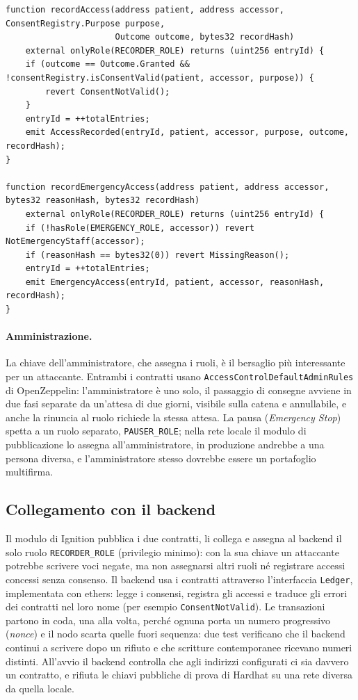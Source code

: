 \begin{lstlisting}[language=Solidity,caption={Registrazione degli accessi (\texttt{AuditLog.sol}, estratto).},label={lst:audit}]
function recordAccess(address patient, address accessor, ConsentRegistry.Purpose purpose,
                      Outcome outcome, bytes32 recordHash)
    external onlyRole(RECORDER_ROLE) returns (uint256 entryId) {
    if (outcome == Outcome.Granted && !consentRegistry.isConsentValid(patient, accessor, purpose)) {
        revert ConsentNotValid();
    }
    entryId = ++totalEntries;
    emit AccessRecorded(entryId, patient, accessor, purpose, outcome, recordHash);
}

function recordEmergencyAccess(address patient, address accessor, bytes32 reasonHash, bytes32 recordHash)
    external onlyRole(RECORDER_ROLE) returns (uint256 entryId) {
    if (!hasRole(EMERGENCY_ROLE, accessor)) revert NotEmergencyStaff(accessor);
    if (reasonHash == bytes32(0)) revert MissingReason();
    entryId = ++totalEntries;
    emit EmergencyAccess(entryId, patient, accessor, reasonHash, recordHash);
}
\end{lstlisting}

\paragraph{Amministrazione.} La chiave dell'amministratore, che assegna i ruoli, è il bersaglio più interessante per un attaccante. Entrambi i contratti usano \texttt{AccessControlDefaultAdminRules} di OpenZeppelin: l'amministratore è uno solo, il passaggio di consegne avviene in due fasi separate da un'attesa di due giorni, visibile sulla catena e annullabile, e anche la rinuncia al ruolo richiede la stessa attesa. La pausa (\emph{Emergency Stop}) spetta a un ruolo separato, \texttt{PAUSER\_ROLE}; nella rete locale il modulo di pubblicazione lo assegna all'amministratore, in produzione andrebbe a una persona diversa, e l'amministratore stesso dovrebbe essere un portafoglio multifirma.

\subsection{Collegamento con il backend}\label{sec:collegamento}
Il modulo di Ignition pubblica i due contratti, li collega e assegna al backend il solo ruolo \texttt{RECORDER\_ROLE} (privilegio minimo): con la sua chiave un attaccante potrebbe scrivere voci negate, ma non assegnarsi altri ruoli né registrare accessi concessi senza consenso. Il backend usa i contratti attraverso l'interfaccia \texttt{Ledger}, implementata con ethers: legge i consensi, registra gli accessi e traduce gli errori dei contratti nel loro nome (per esempio \texttt{ConsentNotValid}). Le transazioni partono in coda, una alla volta, perché ognuna porta un numero progressivo (\emph{nonce}) e il nodo scarta quelle fuori sequenza: due test verificano che il backend continui a scrivere dopo un rifiuto e che scritture contemporanee ricevano numeri distinti. All'avvio il backend controlla che agli indirizzi configurati ci sia davvero un contratto, e rifiuta le chiavi pubbliche di prova di Hardhat su una rete diversa da quella locale.


